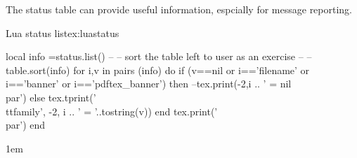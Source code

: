 The status table can provide useful information, espcially for message reporting.

\begin{texexample}{Lua status list}{ex:luastatus}
\begin{multicols}{2}
\begin{luacode}
local info =status.list() 
-- 
-- sort the table left to user as an exercise
-- 
-- table.sort(info)
for i,v in pairs (info) do 
if  (v==nil or i=='filename' or i=='banner' or i=='pdftex_banner') 
   then 
      --tex.print(-2,i .. ' = nil\\par') 
   else 
      tex.tprint({'\\ttfamily'}, {-2, i .. ' =  '..tostring(v)})
   end
   tex.print('\\par')
end

\end{luacode}
\end{multicols}
\end{texexample}

\parindent1em











 